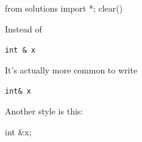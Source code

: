 \begin{python0}
from solutions import *; clear()
\end{python0}

Instead of

\texttt{int \& x}

It's actually more common to write

\texttt{int\& x}

Another style is this:

int \&x;


